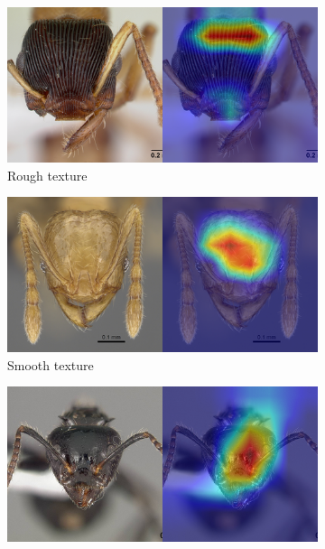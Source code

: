 \documentclass{aci}
\numberwithin{equation}{section}
\begin{document}
\begin{figure}
    \centering
    \begin{subfigure}{\subwidth}
        \includegraphics[width=1\linewidth]{thesis_assets/gradcam/incorrect_ideal/84.png}
        \caption*{Rough texture}
        \label{fig:incorrect_ideal_84}
    \end{subfigure}
    \begin{subfigure}{\subwidth}
        \includegraphics[width=1\linewidth]{thesis_assets/gradcam/incorrect_ideal/86.png}
        \caption*{Smooth texture}
        \label{fig:incorrect_ideal_86}
    \end{subfigure}
    \begin{subfigure}{\subwidth}
        \includegraphics[width=1\linewidth]{thesis_assets/gradcam/incorrect_ideal/177.png}

\end{subfigure}
\end{figure}
\end{document}
